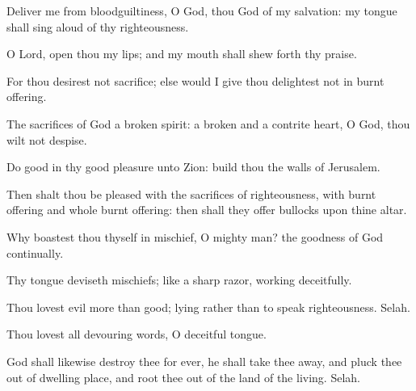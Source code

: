 {\Q {}Deliver me from
bloodguiltiness, O
God, thou
God of my
salvation:
{} my
tongue shall sing
aloud of thy
righteousness.


\par }{\Q {}O
Lord,
open thou my
lips; and my
mouth shall shew
forth thy
praise.


\par }{\Q {}For thou
desirest not
sacrifice; else would I
give
{} thou
delightest not in burnt
offering.


\par }{\Q {}The
sacrifices of
God
{} a
broken
spirit: a
broken and a
contrite
heart, O
God, thou wilt not
despise.


\par }{\Q {}Do
good in thy good
pleasure unto
Zion:
build thou the
walls of
Jerusalem.


\par }{\Q {}Then shalt thou be
pleased with the
sacrifices of
righteousness, with burnt
offering and
whole burnt
offering: then shall they
offer
bullocks upon thine
altar.




\par }
{\Q {}Why
boastest thou thyself in
mischief, O
mighty man? the
goodness of
God
{}
continually.


\par }{\Q {}Thy
tongue
deviseth
mischiefs; like a
sharp
razor,
working
deceitfully.


\par }{\Q {}Thou
lovest
evil more than
good;
{}
lying rather than to
speak
righteousness.
Selah.


\par }{\Q {}Thou
lovest all
devouring
words, O
{}
deceitful
tongue.


\par }{\Q {}God shall likewise
destroy thee for
ever, he shall take thee
away, and pluck thee
out of
{} dwelling
place, and root thee
out of the
land of the
living.
Selah.


\par }{\BB \par }
